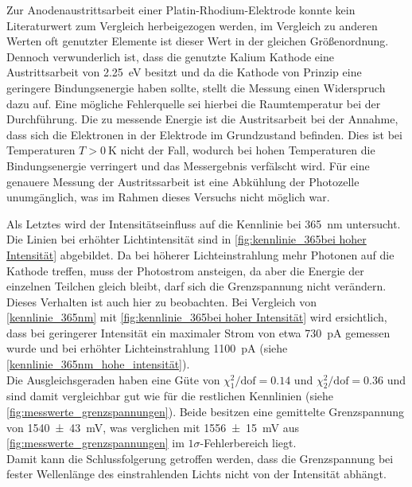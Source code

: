 Zur Anodenaustrittsarbeit einer Platin-Rhodium-Elektrode
konnte kein Literaturwert zum Vergleich herbeigezogen werden, im Vergleich
zu anderen Werten oft genutzter Elemente\cite{wiki:austrittsarbeit} ist dieser Wert in der
gleichen Größenordnung. Dennoch verwunderlich ist, dass die genutzte Kalium
Kathode eine Austrittsarbeit von \SI{2.25}{\electronvolt}\cite{wiki:austrittsarbeit}
besitzt und da die Kathode von Prinzip eine geringere Bindungsenergie
haben sollte, stellt die Messung einen Widerspruch dazu auf. Eine mögliche
Fehlerquelle sei hierbei die Raumtemperatur bei der Durchführung.
Die zu messende Energie ist die Austritsarbeit bei der Annahme, dass sich 
die Elektronen in der Elektrode im Grundzustand befinden. Dies ist 
bei Temperaturen $T>\SI{0}{\kelvin}$ nicht der Fall, wodurch bei hohen Temperaturen
die Bindungsenergie verringert und das Messergebnis verfälscht wird. 
Für eine genauere Messung der Austritssarbeit ist eine Abkühlung 
der Photozelle unumgänglich, was im Rahmen dieses Versuchs nicht möglich war.\\\par



Als Letztes wird der Intensitätseinfluss auf die Kennlinie bei \SI{365}{\nano\meter}
untersucht. Die Linien bei erhöhter Lichtintensität sind in \cref{fig:kennlinie_365bei hoher Intensität}
abgebildet. Da bei höherer Lichteinstrahlung mehr Photonen
auf die Kathode treffen, muss der Photostrom ansteigen, da
aber die Energie der einzelnen Teilchen gleich bleibt, darf sich
die Grenzspannung nicht verändern.\\
Dieses Verhalten ist auch hier zu beobachten. Bei Vergleich von \cref{kennlinie_365nm} mit
\cref{fig:kennlinie_365bei hoher Intensität} wird ersichtlich, dass
bei geringerer Intensität ein maximaler Strom von etwa \SI{730}{\pico\ampere} gemessen
wurde und bei erhöhter Lichteinstrahlung \SI{1100}{\pico\ampere} (siehe
\cref{kennlinie_365nm_hohe_intensität}).\\

Die Ausgleichsgeraden haben eine Güte von $\chi^2_1/\mathrm{dof} = \num{0.14}$ und
$\chi^2_2/\mathrm{dof} = \num{0.36}$ und sind damit vergleichbar gut wie für die restlichen
Kennlinien (siehe \cref{fig:messwerte_grenzspannungen}). Beide besitzen eine gemittelte
Grenzspannung von \SI{1540\pm43}{\milli\volt}, was verglichen mit \SI{1556\pm 15}{\milli\volt}
aus \cref{fig:messwerte_grenzspannungen} im $1\sigma$-Fehlerbereich liegt. \\
Damit kann die Schlussfolgerung getroffen werden, dass die Grenzspannung
bei fester Wellenlänge des einstrahlenden Lichts nicht von der Intensität abhängt.
